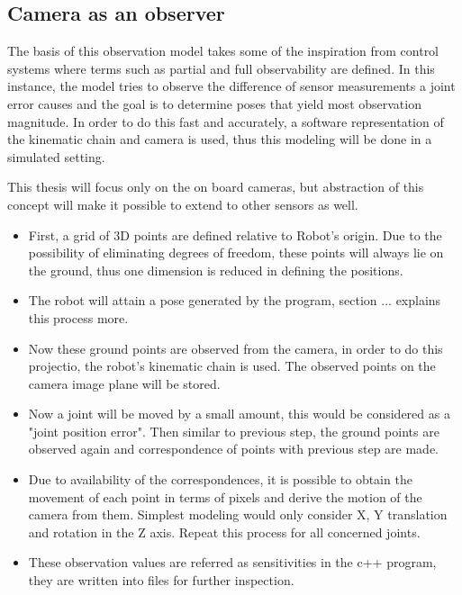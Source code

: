 \documentclass[english, printversion, nomenclature, notitle]{tuvisionthesis} %
\begin{document}
\subsection{Camera as an observer}


The basis of this observation model takes some of the inspiration from control systems where terms such as partial and full observability are defined. In this instance, the model tries to observe the difference of sensor measurements a joint error causes and the goal is to determine poses that yield most observation magnitude. In order to do this fast and accurately, a software representation of the kinematic chain and camera is used, thus this modeling will be done in a simulated setting.

This thesis will focus only on the on board cameras, but abstraction of this concept will make it possible to extend to other sensors as well.

\begin{itemize}
	\item First, a grid of 3D points are defined relative to Robot's origin. Due to the possibility of eliminating degrees of freedom, these points will always lie on the ground, thus one dimension is reduced in defining the positions.
	\item The robot will attain a pose generated by the program, section ...  explains this process more.
	\item Now these ground points are observed from the camera, in order to do this projectio, the robot's kinematic chain is used. The observed points on the camera image plane will be stored.
	\item Now a joint will be moved by a small amount, this would be considered as a "joint position error". Then similar to previous step, the ground points are observed again and correspondence of points with previous step are made.
	\item Due to availability of the correspondences, it is possible to obtain the movement of each point in terms of pixels and derive the motion of the camera from them. Simplest modeling would only consider X, Y translation and rotation in the Z axis. Repeat this process for all concerned joints.
	\item These observation values are referred as sensitivities in the c++ program, they are written into files for further inspection.	
\end{itemize}
\end{document}
